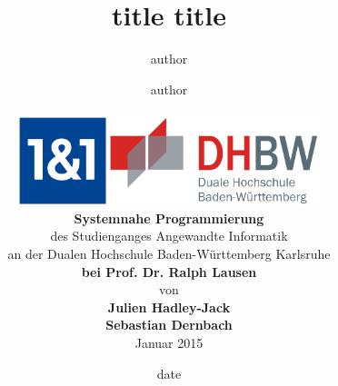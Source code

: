 \documentclass[
    pagesize=pdftex,    %
    twoside=false,      %
    fontsize=12pt,      %
    parskip=half,       %
    headsepline,        %
    footsepline,        %
    abstract=false,     %
    listof=totoc,       %
    toc=bibliography,   %
]{scrreprt}
\title{ {{ title }} }
\author{ {{ author }} }
\date{ {{ date }} }
\begin{document}
{%
{%
{%


\title{ {{ title }} }

{%
\renewcommand{\today}{ {{ date }} }
{%
\date{}
{%

{%
    \author{
        {%
            {{ author }} \\
        {%
    }
{%

\begin{titlepage}
	\begin{longtable}{p{} p{}}
	  {\includegraphics[height=2.6cm]{images/1und1-logo}} & 
	  {\includegraphics[height=2.6cm]{images/dhbw.png}}
	\end{longtable}
	\enlargethispage{20mm}
	\begin{center}
	  \vspace*{12mm}	{\LARGE\bf Systemnahe Programmierung }\\
	  \vspace*{12mm}	des Studienganges Angewandte Informatik\\
	  \vspace*{3mm} 	an der Dualen Hochschule Baden-Württemberg Karlsruhe\\
	  \vspace*{12mm}	{\large\bf bei Prof. Dr. Ralph Lausen}\\
	  \vspace*{12mm}	von\\
	  \vspace*{3mm} 	{\large\bf Julien Hadley-Jack\\Sebastian Dernbach}\\
	  \vspace*{12mm}	Januar 2015\\
	\end{center}
	\vfill
\end{titlepage}

}}}}}}}}}}
\end{document}

